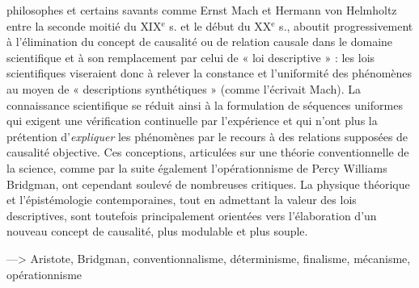 philosophes et certains savants comme
Ernst Mach et Hermann von Helmholtz
entre la seconde moitié du {\footnotesize XIX}$^\text{e}$ s. et le
début du {\footnotesize XX}$^\text{e}$ s., aboutit progressivement
à l'élimination du concept de causalité ou
de relation causale dans le domaine scientifique et à son remplacement par celui
de « loi descriptive » : les lois scientifiques
viseraient donc à relever la constance et
l’uniformité des phénomènes au moyen
de « descriptions synthétiques » (comme
l’écrivait Mach). La connaissance scientifique se réduit ainsi à la formulation de
séquences uniformes qui exigent une vérification continuelle par l'expérience et qui
n’ont plus la prétention d'{\it expliquer} les
phénomènes par le recours à des relations
supposées de causalité objective. Ces
conceptions, articulées sur une théorie
conventionnelle de la science, comme par
la suite également l’opérationnisme de
Percy Williams Bridgman, ont cependant
soulevé de nombreuses critiques. La
physique théorique et l’épistémologie
contemporaines, tout en admettant la
valeur des lois descriptives, sont toutefois
principalement orientées vers l’élaboration d’un nouveau concept de causalité,
plus modulable et plus souple.

 

—> Aristote, Bridgman, conventionnalisme, déterminisme, finalisme,
mécanisme, opérationnisme
